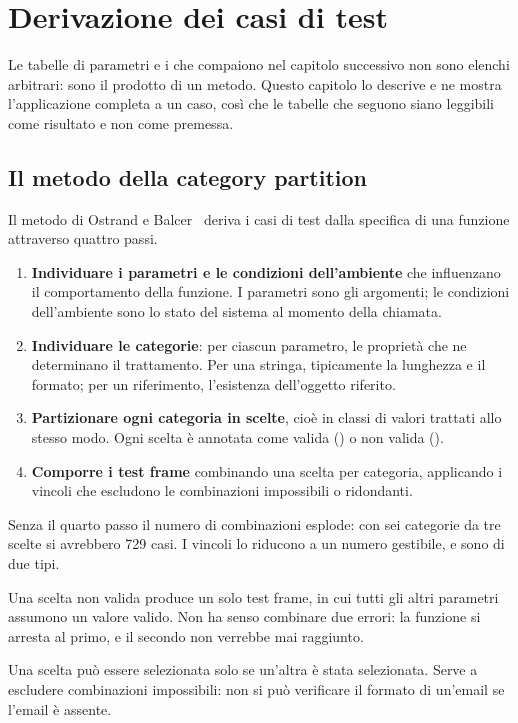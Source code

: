\chapter{Derivazione dei casi di test}
\label{cap:td-derivazione}

Le tabelle di parametri e i  che compaiono nel capitolo
successivo non sono elenchi arbitrari: sono il prodotto di un metodo. Questo
capitolo lo descrive e ne mostra l'applicazione completa a un caso, così che
le tabelle che seguono siano leggibili come risultato e non come premessa.

\section{Il metodo della category partition}

Il metodo di Ostrand e Balcer~\cite{ostrand1988} deriva i casi di test dalla
specifica di una funzione attraverso quattro passi.

\begin{enumerate}
  \item \textbf{Individuare i parametri e le condizioni dell'ambiente} che
    influenzano il comportamento della funzione. I parametri sono gli
    argomenti; le condizioni dell'ambiente sono lo stato del sistema al
    momento della chiamata.
  \item \textbf{Individuare le categorie}: per ciascun parametro, le
    proprietà che ne determinano il trattamento. Per una stringa, tipicamente
    la lunghezza e il formato; per un riferimento, l'esistenza dell'oggetto
    riferito.
  \item \textbf{Partizionare ogni categoria in scelte}, cioè in classi di
    valori trattati allo stesso modo. Ogni scelta è annotata come valida
    (\id{[valido]}) o non valida (\id{[errore]}).
  \item \textbf{Comporre i test frame} combinando una scelta per categoria,
    applicando i vincoli che escludono le combinazioni impossibili o
    ridondanti.
\end{enumerate}

Senza il quarto passo il numero di combinazioni esplode: con sei categorie da
tre scelte si avrebbero 729 casi. I vincoli lo riducono a un numero
gestibile, e sono di due tipi.

\begin{description}[leftmargin=1.4cm,style=nextline]
  \item[\id{[error]}] Una scelta non valida produce un solo test frame, in cui
    tutti gli altri parametri assumono un valore valido. Non ha senso
    combinare due errori: la funzione si arresta al primo, e il secondo non
    verrebbe mai raggiunto.
  \item[\id{[property]} e \id{[if]}] Una scelta può essere selezionata solo se
    un'altra è stata selezionata. Serve a escludere combinazioni impossibili:
    non si può verificare il formato di un'email se l'email è assente.
\end{description}

